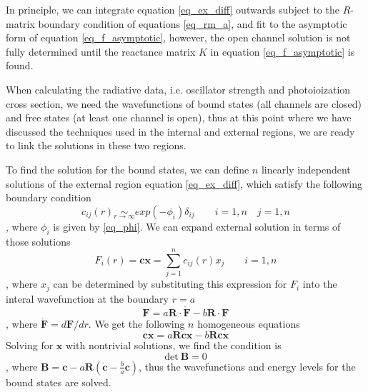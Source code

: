 In principle, we can integrate equation \ref{eq_ex_diff} outwards subject to the $R$-matrix boundary condition of equations \ref{eq_rm_a}, and fit to the asymptotic form of equation \ref{eq_f_asymptotic}, however, the open channel solution is not fully determined until the reactance matrix $K$ in equation \ref{eq_f_asymptotic} is found.

When calculating the radiative data, i.e. oscillator strength and photoioization cross section, we need the wavefunctions of bound states (all channels are closed) and free states (at least one channel is open), thus at this point where we have discussed the techniques used in the internal and external regions, we are ready to link the solutions in these two regions.

To find the solution for the bound states, we can define $n$ linearly  independent solutions of the external region equation \ref{eq_ex_diff}, which satisfy the following boundary condition
\begin{equation}
	c_{ij}(r) \underset{r \to \infty}{\sim} exp(-\phi_i)\delta_{ij} \qquad i = 1,n \quad j = 1, n
\end{equation}
, where $\phi_i$ is given by \ref{eq_phi}. We can expand external solution in terms of those solutions
\begin{equation}
	F_i(r) = \textbf{cx} = \sum_{j=1}^n c_{ij}(r)x_j \qquad i = 1,n 
\end{equation} 
, where $x_j$ can be determined by substituting this expression for $F_i$ into the interal wavefunction at the boundary $r=a$
\begin{equation} \label{eq_frmb}
	\mathbf{F} = a\textbf{R} \cdot \dot{\mathbf{F}} - b \mathbf{R} \cdot \mathbf{F}
\end{equation}
, where $\dot{\mathbf{F}} = d\mathbf{F}/dr$. We get the following $n$ homogeneous equations 
\begin{equation}
	\mathbf{cx} = a \mathbf{R\dot{c}x} - b \mathbf{Rcx}
\end{equation}
Solving for $\mathbf{x}$ with nontrivial solutions, we find the condition is 
\begin{equation}
	\text{det}~ \mathbf{B} = 0
\end{equation}
, where $\mathbf{B} = \mathbf{c} - a \mathbf{R}(\dot{\mathbf{c}}- \frac{b}{a}\mathbf{c})$, thus the wavefunctions and energy levels for the bound states are solved.

